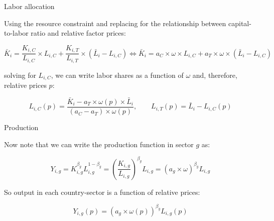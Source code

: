 \documentclass[notes,11pt, aspectratio=169, xcolor=table]{beamer}
\newenvironment{wideitemize}{\itemize\addtolength{\itemsep}{10pt}}{\enditemize}
\begin{document}
\begin{frame}{Labor allocation}

\begin{wideitemize}
    \item Using the resource constraint and replacing for the relationship between capital-to-labor ratio and relative factor prices:

\begin{equation*}
   \bar{K}_i = \frac{K_{i,C}}{L_{i,C}} \times L_{i,C} + \frac{K_{i,T}}{L_{i,T}} \times (\bar{L}_i-L_{i,C}) \iff  \bar{K}_i  = a_C\times \omega  \times L_{i,C} + a_T \times \omega \times (\bar{L}_i-L_{i,C})
\end{equation*}

\item solving for $L_{i,C}$, we can write labor shares as a function of $\omega$ and, therefore, relative prices $p$:

\begin{equation*}\label{eq: lc}
    \boxed{
    L_{i,C}(p) = \frac{\bar{K}_i - a_T \times \omega(p) \times \bar{L}_i}{(a_C- a_T) \times \omega(p)}, \qquad L_{i,T}(p) = \bar{L}_i - L_{i,C}(p)
    }
\end{equation*}

\end{wideitemize}
    
\end{frame}

\begin{frame}{Production}

\begin{wideitemize}
\item Now note that we can write the production function in sector $g$ as:

\begin{equation*}
    Y_{i,g} = K_{i,g}^{\beta_g} L_{i,g}^{1-\beta_g} = \left(\frac{K_{i,g}}{L_{i,g}}\right)^{\beta_g} L_{i,g} =  \left(a_g \times \omega\right)^{\beta_g} L_{i,g} 
\end{equation*}

\item So output in each country-sector is a function of relative prices:

\begin{equation*}
\boxed{
    Y_{i,g}(p) =  \left(a_g \times \omega(p) \right)^{\beta_g} L_{i,g}(p) 
}
\end{equation*}
\end{wideitemize}
    
\end{frame}
\end{document}
